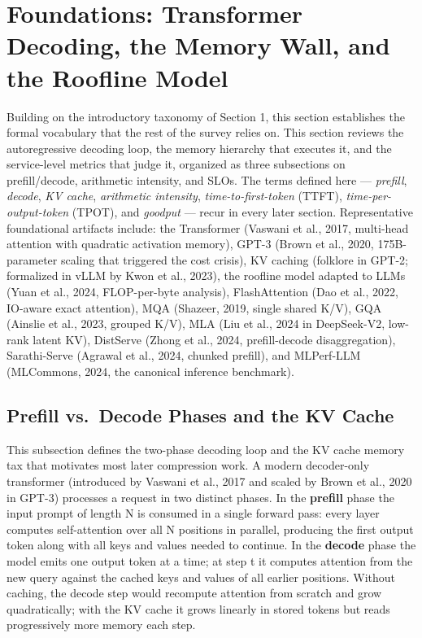 \section{Foundations: Transformer Decoding, the Memory Wall, and the Roofline Model}\label{foundations-transformer-decoding-the-memory-wall-and-the-roofline-model}

Building on the introductory taxonomy of Section 1, this section establishes the formal vocabulary that the rest of the survey relies on. This section reviews the autoregressive decoding loop, the memory hierarchy that executes it, and the service-level metrics that judge it, organized as three subsections on prefill/decode, arithmetic intensity, and SLOs. The terms defined here --- \emph{prefill}, \emph{decode}, \emph{KV cache}, \emph{arithmetic intensity}, \emph{time-to-first-token} (TTFT), \emph{time-per-output-token} (TPOT), and \emph{goodput} --- recur in every later section. Representative foundational artifacts include: the Transformer (Vaswani et al., 2017, multi-head attention with quadratic activation memory), GPT-3 (Brown et al., 2020, 175B-parameter scaling that triggered the cost crisis), KV caching (folklore in GPT-2; formalized in vLLM by Kwon et al., 2023), the roofline model adapted to LLMs (Yuan et al., 2024, FLOP-per-byte analysis), FlashAttention (Dao et al., 2022, IO-aware exact attention), MQA (Shazeer, 2019, single shared K/V), GQA (Ainslie et al., 2023, grouped K/V), MLA (Liu et al., 2024 in DeepSeek-V2, low-rank latent KV), DistServe (Zhong et al., 2024, prefill-decode disaggregation), Sarathi-Serve (Agrawal et al., 2024, chunked prefill), and MLPerf-LLM (MLCommons, 2024, the canonical inference benchmark).

\subsection{Prefill vs.~Decode Phases and the KV Cache}\label{prefill-vs.-decode-phases-and-the-kv-cache}

This subsection defines the two-phase decoding loop and the KV cache memory tax that motivates most later compression work. A modern decoder-only transformer (introduced by Vaswani et al., 2017 and scaled by Brown et al., 2020 in GPT-3) processes a request in two distinct phases. In the \textbf{prefill} phase the input prompt of length N is consumed in a single forward pass: every layer computes self-attention over all N positions in parallel, producing the first output token along with all keys and values needed to continue. In the \textbf{decode} phase the model emits one output token at a time; at step t it computes attention from the new query against the cached keys and values of all earlier positions. Without caching, the decode step would recompute attention from scratch and grow quadratically; with the KV cache it grows linearly in stored tokens but reads progressively more memory each step.

